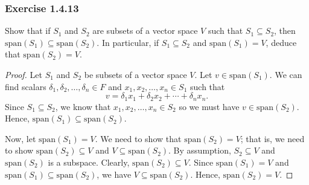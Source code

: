 \subsubsection{Exercise 1.4.13}  Show that if \( S_{1}  \) and \( S_{2}  \) are subsets of a vector space \( V  \) such that \( S_{1} \subseteq S_{2} \), then \( \text{span}(S_{1}) \subseteq  \text{span}(S_{2}) \). In particular, if \( S_{1} \subseteq S_{2}  \) and \( \text{span}(S_{1}) = V  \), deduce that \( \text{span}(S_{2})  = V \).

\begin{proof}
    Let \( S_{1}  \) and \( S_{2}  \) be subsets of a vector space \( V  \). Let \( v \in \text{span}(S_{1}) \). We can find scalars \( \delta_{1} , \delta_{2}, \dots , \delta_{n} \in F  \) and \( x_{1}, x_{2}, \dots, x_{n} \in S_{1} \) such that 
    \[  v = \delta_{1} x_{1} + \delta_{2} x_{2} + \cdots + \delta_{n} x_{n}.  \]
    Since \( S_{1} \subseteq S_{2} \), we know that \( x_{1}, x_{2}, \dots, x_{n} \in S_{2} \) so we must have \( v \in \text{span}(S_{2}) \). Hence, \( \text{span}(S_{1}) \subseteq \text{span}(S_{2}) \). 

    Now, let \( \text{span}(S_{1}) = V  \). We need to show that \( \text{span}(S_{2} ) = V  \); that is, we need to show \( \text{span}(S_{2}) \subseteq V  \) and \( V \subseteq \text{span}(S_{2}) \). By assumption, \( S_{2} \subseteq V  \) and \( \text{span}(S_{2}) \) is a subspace. Clearly, \( \text{span}(S_{2}) \subseteq V  \). Since \( \text{span}(S_{1})  = V \) and \( \text{span}(S_{1})  \subseteq \text{span}(S_{2})\), we have \( V \subseteq \text{span}(S_{2}) \). Hence, \( \text{span}(S_{2})  = V \).
\end{proof}



